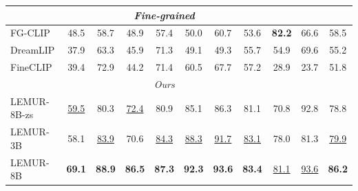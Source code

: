 \begin{tabular}{lcccccccccc}
\midrule
\multicolumn{10}{c}{\textit{Fine-grained}} \\
\midrule
FG-CLIP & 48.5 & 58.7 & 48.9 & 57.4 & 50.0 & 60.7 & 53.6 & \textbf{82.2} & 66.6 & 58.5\\
DreamLIP & 37.9 & 63.3 & 45.9 & 71.3 & 49.1 & 49.3 & 55.7 & 54.9 & 69.6 & 55.2\\
FineCLIP & 39.4 & 72.9 & 44.2 & 71.4 & 60.5 & 67.7 & 57.2 & 28.9 & 23.7 & 51.8\\
\midrule
\multicolumn{10}{c}{\textit{Ours}} \\
\midrule
LEMUR-8B-zs & \underline{59.5} & 80.3 & \underline{72.4} & 80.9 & 85.1 & 86.3 & 81.1 & 70.8 & 92.8 & 78.8 \\
LEMUR-3B & 58.1 & \underline{83.9} & 70.6 & \underline{84.3} & \underline{88.3} & \underline{91.7} & \underline{83.1} & 78.0 & 81.3 & \underline{79.9} \\
LEMUR-8B & \textbf{69.1} & \textbf{88.9} & \textbf{86.5} & \textbf{87.3} & \textbf{92.3} & \textbf{93.6} & \textbf{83.4} & \underline{81.1} & \underline{93.6} & \textbf{86.2} \\

\bottomrule
\end{tabular}


